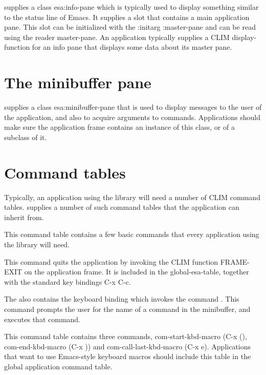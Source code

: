 \sysname{} supplies a class esa:info-pane which is typically used to display
something similar to the status line of Emacs.  It supplies a slot
that contains a main application pane.  This slot can be initialized
with the :initarg :master-pane and can be read using the reader
master-pane.  An application typically supplies a CLIM
display-function for an info pane that displays some data about its 
master pane. 

\section{The minibuffer pane}

\sysname{} supplies a class esa:minibuffer-pane that is used to display
messages to the user of the application, and also to acquire arguments
to commands.  Applications should make sure the application frame
contains an instance of this class, or of a subclass of it.  

\section{Command tables}

Typically, an application using the \sysname{} library will need a number of
CLIM command tables.  \sysname{} supplies a number of such command tables
that the application can inherit from.  


This command table contains a few basic commands that every
application using the \sysname{} library will need.

 {}

This command quits the application by invoking the CLIM function
FRAME-EXIT on the application frame.  It is included in the
global-esa-table, together with the standard key bindings C-x C-c. 

The  also contains the keyboard binding
 which invokes the command .  This
command prompts the user for the name of a command in the minibuffer,
and executes that command.


This command table contains three commands, com-start-kbd-macro (C-x
(), com-end-kbd-macro (C-x )) and com-call-last-kbd-macro (C-x e).
Applications that want to use Emacs-style keyboard macros should
include this table in the global application command table. 
